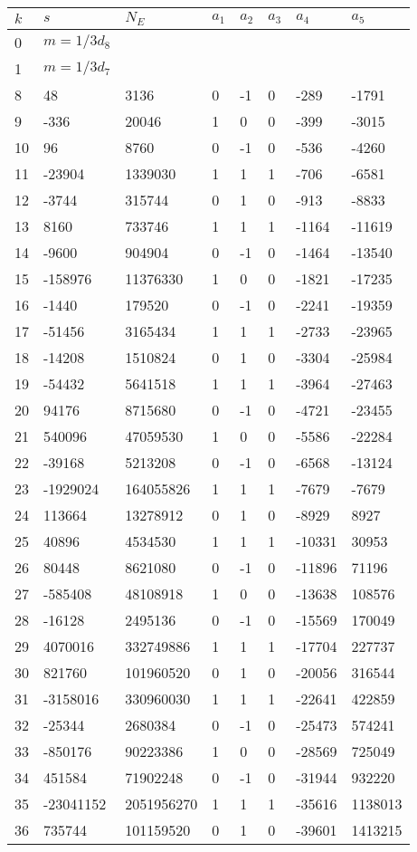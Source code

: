 \documentclass{amsart}
\begin{document}
\begin{longtable}{|l|l|l|lllll|}
\hline
$k$ & $s$ & $N_E$ & $a_1$ & $a_2$ & $a_3$ & $a_4$ & $a_5$\\
\hline
0&$m=1/3d_{8}$&&\multicolumn{5}{c|}{}\\
1&$m=1/3d_{7}$&&\multicolumn{5}{c|}{}\\
8&48&3136&0&-1&0&-289&-1791\\
9&-336&20046&1&0&0&-399&-3015\\
10&96&8760&0&-1&0&-536&-4260\\
11&-23904&1339030&1&1&1&-706&-6581\\
12&-3744&315744&0&1&0&-913&-8833\\
13&8160&733746&1&1&1&-1164&-11619\\
14&-9600&904904&0&-1&0&-1464&-13540\\
15&-158976&11376330&1&0&0&-1821&-17235\\
16&-1440&179520&0&-1&0&-2241&-19359\\
17&-51456&3165434&1&1&1&-2733&-23965\\
18&-14208&1510824&0&1&0&-3304&-25984\\
19&-54432&5641518&1&1&1&-3964&-27463\\
20&94176&8715680&0&-1&0&-4721&-23455\\
21&540096&47059530&1&0&0&-5586&-22284\\
22&-39168&5213208&0&-1&0&-6568&-13124\\
23&-1929024&164055826&1&1&1&-7679&-7679\\
24&113664&13278912&0&1&0&-8929&8927\\
25&40896&4534530&1&1&1&-10331&30953\\
26&80448&8621080&0&-1&0&-11896&71196\\
27&-585408&48108918&1&0&0&-13638&108576\\
28&-16128&2495136&0&-1&0&-15569&170049\\
29&4070016&332749886&1&1&1&-17704&227737\\
30&821760&101960520&0&1&0&-20056&316544\\
31&-3158016&330960030&1&1&1&-22641&422859\\
32&-25344&2680384&0&-1&0&-25473&574241\\
33&-850176&90223386&1&0&0&-28569&725049\\
34&451584&71902248&0&-1&0&-31944&932220\\
35&-23041152&2051956270&1&1&1&-35616&1138013\\
36&735744&101159520&0&1&0&-39601&1413215\\

\end{longtable}
\end{document}
